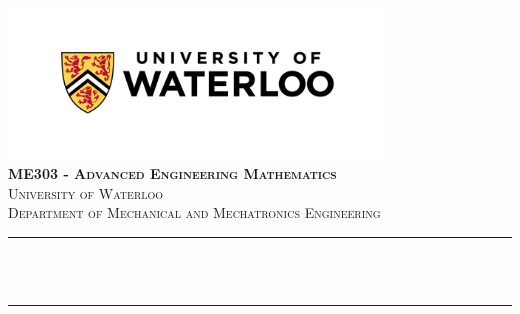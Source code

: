 \begin{titlepage}

\newcommand{\HRule}{\rule{\linewidth}{0.5mm}} %





\begin{center} %


\includegraphics[width = 10cm]{./figures/uw}\\[1.5cm] 
\textbf{\textsc{\Large ME303 - Advanced Engineering Mathematics}}\\[1.0cm] 
\textsc{\Large University of Waterloo}\\[0.5cm] 
\textsc{\large Department of Mechanical and Mechatronics Engineering}\\[0.95cm] 


\HRule \\[0.4cm]
{ \huge \bfseries \reporttitle}\\ %
\HRule \\[1.5cm]
\end{center}


\end{titlepage}

